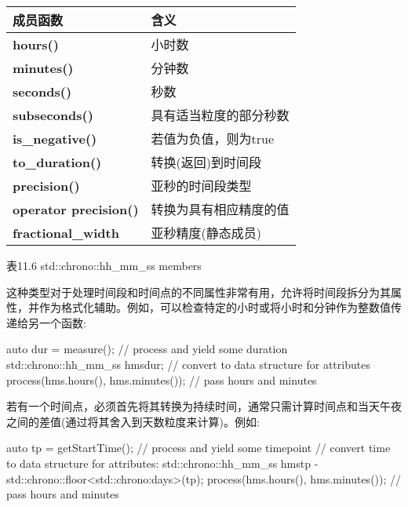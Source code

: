 \begin{longtable}[c]{|l|l|}
\hline
\textbf{成员函数}               & \textbf{含义}                                       \\ \hline
\endfirsthead
%
\endhead
%
\textbf{hours()}              & 小时数                                            \\ \hline
\textbf{minutes()}            & 分钟数                                          \\ \hline
\textbf{seconds()}            & 秒数                                          \\ \hline
\textbf{subseconds()}         & 具有适当粒度的部分秒数 \\ \hline
\textbf{is\_negative()}       & 若值为负值，则为true                          \\ \hline
\textbf{to\_duration()}       & 转换(返回)到时间段                         \\ \hline
\textbf{precision()}          & 亚秒的时间段类型                        \\ \hline
\textbf{operator precision()} & 转换为具有相应精度的值       \\ \hline
\textbf{fractional\_width}    & 亚秒精度(静态成员)            \\ \hline
\end{longtable}

\begin{center}
表11.6 std::chrono::hh\_mm\_ss members
\end{center}

这种类型对于处理时间段和时间点的不同属性非常有用，允许将时间段拆分为其属性，并作为格式化辅助。例如，可以检查特定的小时或将小时和分钟作为整数值传递给另一个函数:

\begin{cpp}
auto dur = measure(); // process and yield some duration
std::chrono::hh_mm_ss hms{dur}; // convert to data structure for attributes
process(hms.hours(), hms.minutes()); // pass hours and minutes
\end{cpp}

若有一个时间点，必须首先将其转换为持续时间，通常只需计算时间点和当天午夜之间的差值(通过将其舍入到天数粒度来计算)。例如:

\begin{cpp}
auto tp = getStartTime(); // process and yield some timepoint
// convert time to data structure for attributes:
std::chrono::hh_mm_ss hms{tp - std::chrono::floor<std::chrono:days>(tp)};
process(hms.hours(), hms.minutes()); // pass hours and minutes
\end{cpp}

